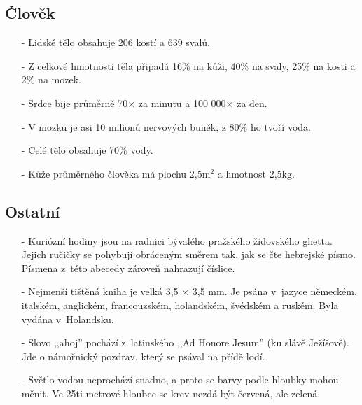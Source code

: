 \begin{multicols}{2}
\begin{itemize}
\end{itemize}

\subsection{Člověk}

\begin{itemize}
\itemsep -3pt

\item[-] Lidské tělo obsahuje 206 kostí a 639 svalů.

\item[-] Z celkové hmotnosti těla připadá 16\% na kůži, 40\% na svaly,
25\% na kosti a 2\% na mozek.

\item[-] Srdce bije průměrně 70$\times$ za minutu a 100 000$\times$ za
den.

\item[-] V mozku je asi 10 milionů nervových buněk, z 80\% ho tvoří voda.

\item[-] Celé tělo obsahuje 70\% vody.

\item[-] Kůže průměrného člověka má plochu 2,5m$^2$ a hmotnost 2,5kg.

\end{itemize}

\subsection{Ostatní}

\begin{itemize}
\itemsep -3pt

\item[-] Kuriózní hodiny jsou na radnici bývalého pražského židovského 
ghetta. Jejich ručičky se pohybují obráceným směrem tak, jak 
se čte hebrejské písmo. Písmena z~této abecedy zároveň 
nahrazují číslice.

\item[-] Nejmenší tištěná kniha je velká 3,5 $\times$ 3,5 mm. Je psána
v~jazyce německém, italském, anglickém, francouzském, holandském, švédském
a ruském. Byla vydána v~Holandsku.

\item[-] Slovo ,,ahoj'' pochází z~latinského ,,Ad Honore Jesum'' 
(ku slávě Ježíšově). Jde o námořnický pozdrav, který se psával 
na přídě lodí.

\item[-] Světlo vodou neprochází snadno, a proto se barvy podle hloubky 
mohou měnit. Ve 25ti metrové hloubce se krev nezdá být červená, 
ale zelená.


\end{itemize}
\end{multicols}
